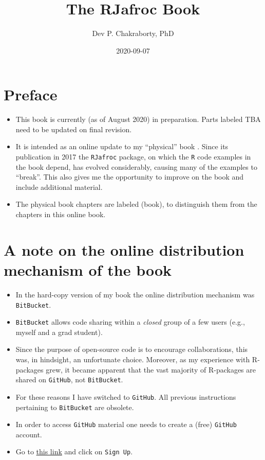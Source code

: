 \documentclass[
]{book}
\title{The RJafroc Book}
\author{Dev P. Chakraborty, PhD}
\date{2020-09-07}
\providecommand{\tightlist}{%
  \setlength{\itemsep}{0pt}\setlength{\parskip}{0pt}}
\begin{document}
\maketitle

{
\setcounter{tocdepth}{1}
\tableofcontents
}
\hypertarget{preface}{%
\chapter*{Preface}\label{preface}}

\begin{itemize}
\tightlist
\item
  This book is currently (as of August 2020) in preparation. Parts labeled TBA need to be updated on final revision.
\item
  It is intended as an online update to my ``physical'' book \citep{RN2680}. Since its publication in 2017 the \texttt{RJafroc} package, on which the \texttt{R} code examples in the book depend, has evolved considerably, causing many of the examples to ``break''. This also gives me the opportunity to improve on the book and include additional material.
\item
  The physical book chapters are labeled (book), to distinguish them from the chapters in this online book.
\end{itemize}

\hypertarget{a-note-on-the-online-distribution-mechanism-of-the-book}{%
\chapter*{A note on the online distribution mechanism of the book}\label{a-note-on-the-online-distribution-mechanism-of-the-book}}

\begin{itemize}
\tightlist
\item
  In the hard-copy version of my book \citep{RN2680} the online distribution mechanism was \texttt{BitBucket}.
\item
  \texttt{BitBucket} allows code sharing within a \emph{closed} group of a few users (e.g., myself and a grad student).
\item
  Since the purpose of open-source code is to encourage collaborations, this was, in hindsight, an unfortunate choice. Moreover, as my experience with R-packages grew, it became apparent that the vast majority of R-packages are shared on \texttt{GitHub}, not \texttt{BitBucket}.
\item
  For these reasons I have switched to \texttt{GitHub}. All previous instructions pertaining to \texttt{BitBucket} are obsolete.
\item
  In order to access \texttt{GitHub} material one needs to create a (free) \texttt{GitHub} account.
\item
  Go to \href{https://github.com}{this link} and click on \texttt{Sign\ Up}.
\end{itemize}
\end{document}
